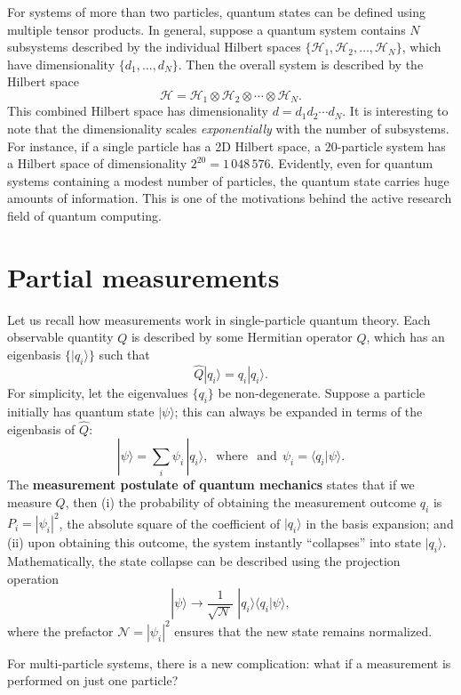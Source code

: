 \documentclass[pra,11pt]{revtex4}
\begin{document}
For systems of more than two particles, quantum states can be defined
using multiple tensor products.  In general, suppose a quantum system
contains $N$ subsystems described by the individual Hilbert spaces
$\{\mathscr{H}_1, \mathscr{H}_2, \dots, \mathscr{H}_N\}$, which have
dimensionality $\{d_1, \dots, d_N\}$.  Then the overall system is
described by the Hilbert space
$$\mathscr{H} = \mathscr{H}_1 \otimes \mathscr{H}_2 \otimes \cdots
\otimes \mathscr{H}_N.$$
This combined Hilbert space has dimensionality $d = d_1 d_2\cdots
d_N$.  It is interesting to note that the dimensionality scales
\textit{exponentially} with the number of subsystems.  For instance,
if a single particle has a 2D Hilbert space, a $20$-particle system
has a Hilbert space of dimensionality $2^{20} =1\,048\,576$.
Evidently, even for quantum systems containing a modest number of
particles, the quantum state carries huge amounts of information.
This is one of the motivations behind the active research field of
quantum computing.

\section{Partial measurements}
\label{sec:partialmeasurements}

Let us recall how measurements work in single-particle quantum theory.
Each observable quantity $Q$ is described by some Hermitian operator
$\hat{Q}$, which has an eigenbasis $\{|q_i\rangle\}$ such that
$$\hat{Q}|q_i\rangle = q_i |q_i\rangle.$$
For simplicity, let the eigenvalues $\{q_i\}$ be non-degenerate.
Suppose a particle initially has quantum state $|\psi\rangle$; this
can always be expanded in terms of the eigenbasis of $\hat{Q}$:
$$|\psi\rangle = \sum_i \psi_i\, |q_i\rangle, \;\;\mathrm{where}\;\;\,\textrm{and}\;\, \psi_i = \langle q_i|\psi\rangle.$$
The \textbf{measurement postulate of quantum mechanics} states that if
we measure $Q$, then (i) the probability of obtaining the measurement
outcome $q_i$ is $P_i = |\psi_i|^2$, the absolute square of the
coefficient of $|q_i\rangle$ in the basis expansion; and (ii) upon
obtaining this outcome, the system instantly ``collapses'' into state
$|q_i\rangle$.  Mathematically, the state collapse can be described
using the projection operation
$$|\psi\rangle \longrightarrow \frac{1}{\sqrt{\mathcal{N}}}\; |q_i\rangle\langle q_i|\psi\rangle,$$
where the prefactor $\mathcal{N} = |\psi_i|^2$ ensures that the new
state remains normalized.

For multi-particle systems, there is a new complication: what if a
measurement is performed on just one particle?
\end{document}
